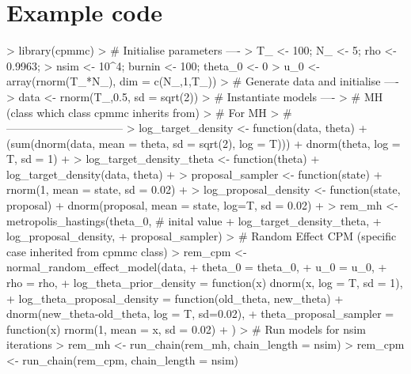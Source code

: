 \documentclass{article}
\begin{document}
\section{Example code}
\begin{Schunk}
\begin{Sinput}
> library(cpmmc)
> # Initialise parameters ----
> T_ <- 100; N_ <- 5; rho <- 0.9963;
> nsim <- 10^4; burnin <- 100; theta_0 <- 0
> u_0 <- array(rnorm(T_*N_), dim = c(N_,1,T_))
> # Generate data and initialise ----
> data <- rnorm(T_,0.5, sd = sqrt(2))
> # Instantiate models ----
> # MH (class which class cpmmc inherits from)
> # For MH
> # --------------------------------
> log_target_density <- function(data, theta){
+   (sum(dnorm(data, mean = theta, sd = sqrt(2), log = T))) + dnorm(theta, log = T, sd = 1)
+ }
> log_target_density_theta <- function(theta){
+   log_target_density(data, theta)
+ }
> proposal_sampler <- function(state){
+   rnorm(1, mean = state, sd = 0.02)
+ }
> log_proposal_density <- function(state, proposal){
+   dnorm(proposal, mean = state, log=T, sd = 0.02)
+ }
> rem_mh <- metropolis_hastings(theta_0, # inital value
+                           log_target_density_theta,
+                           log_proposal_density,
+                           proposal_sampler)
> # Random Effect CPM (specific case inherited from cpmmc class)
> rem_cpm <- normal_random_effect_model(data,
+             theta_0 = theta_0,
+             u_0 = u_0,
+             rho = rho,
+             log_theta_prior_density = function(x) dnorm(x, log = T, sd = 1),
+             log_theta_proposal_density = function(old_theta, new_theta)
+                                           dnorm(new_theta-old_theta, log = T, sd=0.02),
+             theta_proposal_sampler = function(x) rnorm(1, mean = x, sd = 0.02)
+ )
> # Run models for nsim iterations
> rem_mh <- run_chain(rem_mh, chain_length = nsim)
> rem_cpm <- run_chain(rem_cpm, chain_length = nsim)
\end{Sinput}
\end{Schunk}


  
\end{document}
